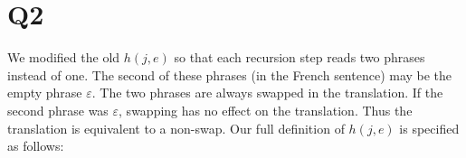 \section*{Q2}
We modified the old $h(j,e)$ so that each recursion step reads two phrases
instead of one. The second of these phrases (in the French sentence) may be
the empty phrase $\varepsilon$. The two phrases are always swapped in the
translation. If the second phrase was $\varepsilon$, swapping has no effect
on the translation. Thus the translation is equivalent to a non-swap.
Our full definition of $h(j,e)$ is specified as follows:


